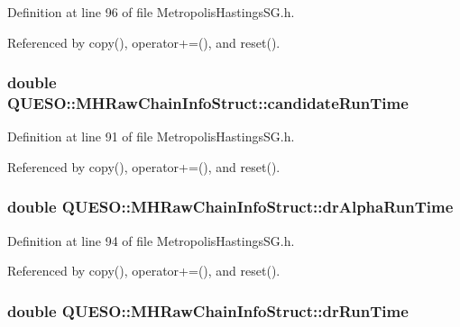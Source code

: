 Definition at line 96 of file Metropolis\-Hastings\-S\-G.\-h.



Referenced by copy(), operator+=(), and reset().

\hypertarget{struct_q_u_e_s_o_1_1_m_h_raw_chain_info_struct_ada3a9649c975062a366df63561c599c7}{
\subsubsection[{candidate\-Run\-Time}]{\setlength{\rightskip}{0pt plus 5cm}double Q\-U\-E\-S\-O\-::\-M\-H\-Raw\-Chain\-Info\-Struct\-::candidate\-Run\-Time}}\label{struct_q_u_e_s_o_1_1_m_h_raw_chain_info_struct_ada3a9649c975062a366df63561c599c7}


Definition at line 91 of file Metropolis\-Hastings\-S\-G.\-h.



Referenced by copy(), operator+=(), and reset().

\hypertarget{struct_q_u_e_s_o_1_1_m_h_raw_chain_info_struct_afa74a9d74fc3e7942012b8d8448f6687}{
\subsubsection[{dr\-Alpha\-Run\-Time}]{\setlength{\rightskip}{0pt plus 5cm}double Q\-U\-E\-S\-O\-::\-M\-H\-Raw\-Chain\-Info\-Struct\-::dr\-Alpha\-Run\-Time}}\label{struct_q_u_e_s_o_1_1_m_h_raw_chain_info_struct_afa74a9d74fc3e7942012b8d8448f6687}


Definition at line 94 of file Metropolis\-Hastings\-S\-G.\-h.



Referenced by copy(), operator+=(), and reset().

\hypertarget{struct_q_u_e_s_o_1_1_m_h_raw_chain_info_struct_acd15a61993f122a3780dfae6f096d9b9}{
\subsubsection[{dr\-Run\-Time}]{\setlength{\rightskip}{0pt plus 5cm}double Q\-U\-E\-S\-O\-::\-M\-H\-Raw\-Chain\-Info\-Struct\-::dr\-Run\-Time}}\label{struct_q_u_e_s_o_1_1_m_h_raw_chain_info_struct_acd15a61993f122a3780dfae6f096d9b9}


